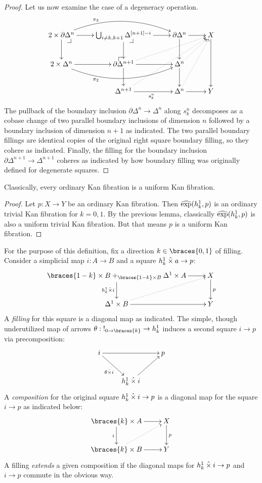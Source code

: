 \documentclass[reqno,10pt,a4paper,oneside]{amsart}
\begin{document}
\begin{proof}
Let us now examine the case of a degeneracy operation.
\[
\xymatrix{
  2 \times \partial \Delta^n
  \ar[r]
  \ar[d]
  \ar@/^2em/[rr]^(0.3){\pi_2}
  \pullback{dr}
&
  \bigcup_{i \neq k, k+1} \Delta^{[n+1] - i}
  \ar[r]
  \ar[d]
  \pullback{dr}
&
  \partial \Delta^n
  \ar[d]
  \ar[r]
&
  X
  \ar[dd]
\\
  2 \times \Delta^n
  \ar[r]
  \ar@/_2em/[rr]_(0.3){\pi_2}
&
  \partial \Delta^{n+1}
  \ar[r]
  \ar[d]
  \ar@{.>}[urr]
  \pullback{ul}
&
  \Delta^n
  \ar[d]
  \ar@{.>}[ur]
\\&
  \Delta^{n+1}
  \ar[r]_{s_k^n}
  \ar@{.>}[uurr]
&
  \Delta^n
  \ar[r]
  \ar@{.>}[uur]
&
  Y
}
\]
The pullback of the boundary inclusion $\partial \Delta^n \to \Delta^n$ along $s_k^n$ decomposes as a cobase change of two parallel boundary inclusions of dimension $n$ followed by a boundary inclusion of dimension $n+1$ as indicated.
The two parallel boundary fillings are identical copies of the original right square boundary filling, so they cohere as indicated.
Finally, the filling for the boundary inclusion $\partial \Delta^{n+1} \to \Delta^{n+1}$ coheres as indicated by how boundary filling was originally defined for degenerate squares.
\end{proof}

\begin{lemma}
Classically, every ordinary Kan fibration is a uniform Kan fibration.
\end{lemma}

\begin{proof}
Let $p : X \to Y$ be an ordinary Kan fibration.
Then $\operatorname{\widehat{exp}}(h_k^1, p)$ is an ordinary trivial Kan fibration for $k = 0, 1$.
By the previous lemma, classically $\operatorname{\widehat{exp}}(h_k^1, p)$ is also a uniform trivial Kan fibration.
But that means $p$ is a uniform Kan fibration.
\end{proof}

\begin{definition}
For the purpose of this definition, fix a direction $k \in \braces{0, 1}$ of filling.
Consider a simplicial map $i : A \to B$ and a square $h_k^1 \mathbin{\hat{\times}} a \to p$:
\[
\xymatrix{
  \braces{1-k} \times B +_{\braces{1-k} \times B} \Delta^1 \times A
  \ar[r]
  \ar[d]_{h_k^1 \hattimes i}
&
  X
  \ar[d]^{p}
\\
  \Delta^1 \times B
  \ar[r]
  \ar@{.>}[ur]
&
  Y
}
\]
A \emph{filling} for this square is a diagonal map as indicated.
The simple, though underutilized map of arrows $\theta : \canonical_{0 \to \braces{k}} \to h_k^1$ induces a second square $i \to p$ via precomposition:
\[
\xymatrix{
  i
  \ar[rr]
  \ar[dr]_{\theta \hattimes i}
&&
  p
\\&
  h_k^1 \hattimes i
  \ar[ur]
}
\]
A \emph{composition} for the original square $h_k^1 \mathbin{\hat{\times}} i \to p$ is a diagonal map for the square $i \to p$ as indicated below:
\[
\xymatrix{
  \braces{k} \times A
  \ar[r]
  \ar[d]_{i}
&
  X
  \ar[d]^{p}
\\
  \braces{k} \times B
  \ar[r]
  \ar@{.>}[ur]
&
  Y
}
\]
A filling \emph{extends} a given composition if the diagonal maps for $h_k^1 \mathbin{\hat{\times}} i \to p$ and $i \to p$ commute in the obvious way.
\end{definition}
\end{document}
